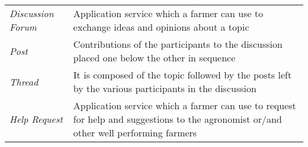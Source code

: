 \begin{center}
\begin{longtable}{|m{3.2cm}|m{8.3cm}|}
\textit{Discussion Forum} & Application service which a farmer can use to exchange ideas and opinions about a topic \\
\textit{Post} & Contributions of the participants to the discussion placed one below the other in sequence\\
\textit{Thread} & It is composed of the topic followed by the posts left by the various participants in the discussion\\
\textit{Help Request} & Application service which a farmer can use to request for help and suggestions to the agronomist or/and other well performing farmers\\
\hline
\end{longtable}
\end{center}